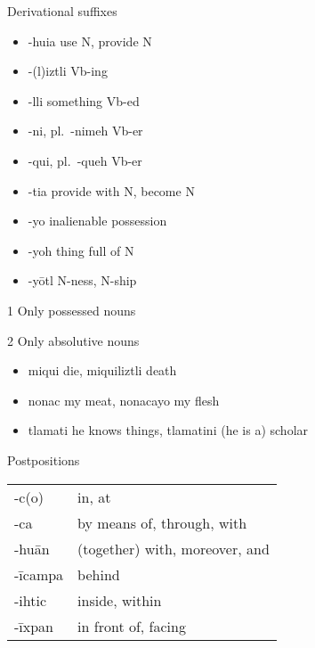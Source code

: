 \documentclass[12pt]{beamer}
\newcommand{\nah}[1]{\textcolor{nahgrn}{#1}}
\newcommand{\trs}[1]{\textcolor{nahblu}{#1}}
\begin{document}
\begin{frame}
\begin{columns}[t]
\begin{column}{.20\linewidth}
\begin{block}{Derivational suffixes}
\begin{threeparttable}
\begin{itemize}
      			\item \nah{-huia} \trs{use N, provide N}
      			\item \nah{-(l)iztli} \trs{Vb-ing}
      			\item \nah{-lli} \trs{something Vb-ed}
      			\item \nah{-ni}, pl.~\nah{-nimeh}  \trs{Vb-er}
      			\item \nah{-qui}, pl.~\nah{-queh}  \trs{Vb-er}
      			\item \nah{-tia} \trs{provide with N, become N}
      			\item \nah{-yo} inalienable possession
      			\item \nah{-yoh} \trs{thing full of N}
      			\item \nah{-yōtl} \trs{N-ness, N-ship}
      		\end{itemize}
      		\begin{tablenotes}
      			\item[1] Only possessed nouns
      			\item[2] Only absolutive nouns
      		\end{tablenotes}
      	\end{threeparttable}
      \end{block}
      \begin{example}
      	\begin{itemize}
      		\item \nah{miqui} \trs{die}, \nah{miquiliztli} \trs{death}
      		\item \nah{nonac} \trs{my meat}, \nah{nonacayo} \trs{my flesh}
      		\item \nah{tlamati} \trs{he knows things}, \nah{tlamatini} \trs{(he is a) scholar}
      	\end{itemize}
      \end{example}
      \begin{block}{Postpositions}
        \begin{tabular}{ll}
          \nah{-c(o)}     & \trs{in, at}                         \\
          \nah{-ca}       & \trs{by means of, through, with}     \\
          \nah{-huān}     & \trs{(together) with, moreover, and} \\
          \nah{-īcampa}   & \trs{behind}                         \\
          \nah{-ihtic}    & \trs{inside, within}                 \\
          \nah{-īxpan}    & \trs{in front of, facing}            \\

\end{tabular}
\end{block}
\end{column}
\end{columns}
\end{frame}
\end{document}
